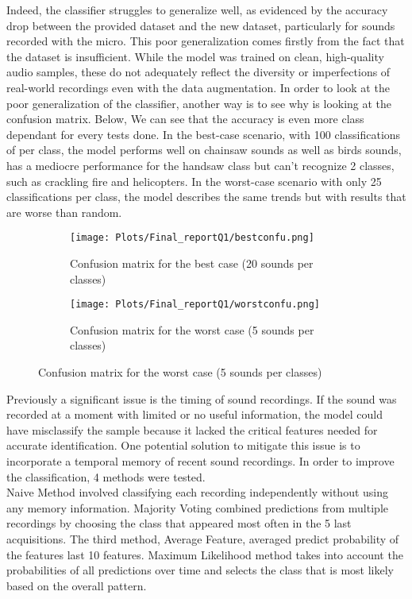 \documentclass{article}
\begin{document}
Indeed, the classifier struggles to generalize well, as evidenced by the accuracy drop between the provided dataset and the new dataset, particularly for sounds recorded with the micro. This poor generalization comes firstly from the fact that the dataset is insufficient. While the model was trained on clean, high-quality audio samples, these do not adequately reflect the diversity or imperfections of real-world recordings even with the data augmentation.
In order to look at the poor generalization of the classifier, another way is to see why is looking at the confusion matrix. Below, We can see that the accuracy is even more class dependant for every tests done. In the best-case scenario, with 100 classifications of per class,  the model performs well on chainsaw sounds as well as birds sounds, has a mediocre performance for the handsaw class but can't recognize 2 classes, such as crackling fire and helicopters. In the worst-case scenario with only 25 classifications per class, the model describes the same trends but with results that are worse than random.

\begin{figure}[H]
    \centering
    \begin{subfigure}{0.4\linewidth}
        \centering
        \texttt{[image: Plots/Final\_reportQ1/bestconfu.png]}
        \caption{Confusion matrix for the best case (20 sounds per classes)}
    \end{subfigure}
    \centering
    \begin{subfigure}{0.4\linewidth}
        \centering
        \texttt{[image: Plots/Final\_reportQ1/worstconfu.png]}
        \caption{Confusion matrix for the worst case (5 sounds per classes)}
    \end{subfigure}    
\end{figure}

Previously a significant issue is the timing of sound recordings. If the sound was recorded at a moment with limited or no useful information, the model could have misclassify the sample because it lacked the critical features needed for accurate identification. One potential solution to mitigate this issue is to incorporate a temporal memory of recent sound recordings. In order to improve the classification, 4 methods were tested.\\
Naive Method involved classifying each recording independently without using any memory information. Majority Voting combined predictions from multiple recordings by choosing the class that appeared most often in the 5 last acquisitions. The third method, Average Feature, averaged predict probability of the features last 10 features. Maximum Likelihood method takes into account the probabilities of all predictions over time and selects the class that is most likely based on the overall pattern. 
\end{document}
